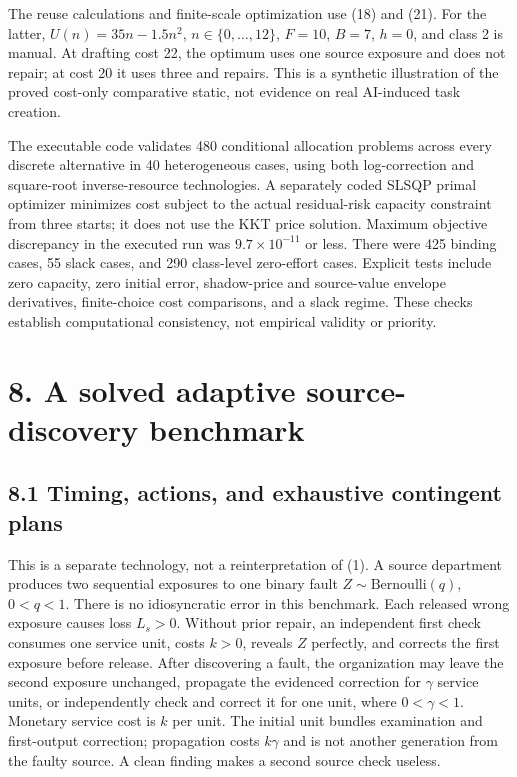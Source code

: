 \documentclass[
  11pt,
  a4paper,
]{article}
\begin{document}
The reuse calculations and finite-scale optimization use (18) and (21).
For the latter, \(U(n)=35n-1.5n^2\), \(n\in\{0,\ldots,12\}\), \(F=10\),
\(B=7\), \(h=0\), and class 2 is manual. At drafting cost 22, the
optimum uses one source exposure and does not repair; at cost 20 it uses
three and repairs. This is a synthetic illustration of the proved
cost-only comparative static, not evidence on real AI-induced task
creation.

The executable code validates 480 conditional allocation problems across
every discrete alternative in 40 heterogeneous cases, using both
log-correction and square-root inverse-resource technologies. A
separately coded SLSQP primal optimizer minimizes cost subject to the
actual residual-risk capacity constraint from three starts; it does not
use the KKT price solution. Maximum objective discrepancy in the
executed run was \(9.7\times10^{-11}\) or less. There were 425 binding
cases, 55 slack cases, and 290 class-level zero-effort cases. Explicit
tests include zero capacity, zero initial error, shadow-price and
source-value envelope derivatives, finite-choice cost comparisons, and a
slack regime. These checks establish computational consistency, not
empirical validity or priority.

\hypertarget{a-solved-adaptive-source-discovery-benchmark}{%
\section{8. A solved adaptive source-discovery
benchmark}\label{a-solved-adaptive-source-discovery-benchmark}}

\hypertarget{timing-actions-and-exhaustive-contingent-plans}{%
\subsection{8.1 Timing, actions, and exhaustive contingent
plans}\label{timing-actions-and-exhaustive-contingent-plans}}

This is a separate technology, not a reinterpretation of (1). A source
department produces two sequential exposures to one binary fault
\(Z\sim\mathrm{Bernoulli}(q)\), \(0<q<1\). There is no idiosyncratic
error in this benchmark. Each released wrong exposure causes loss
\(L_s>0\). Without prior repair, an independent first check consumes one
service unit, costs \(k>0\), reveals \(Z\) perfectly, and corrects the
first exposure before release. After discovering a fault, the
organization may leave the second exposure unchanged, propagate the
evidenced correction for \(\gamma\) service units, or independently
check and correct it for one unit, where \(0<\gamma<1\). Monetary
service cost is \(k\) per unit. The initial unit bundles examination and
first-output correction; propagation costs \(k\gamma\) and is not
another generation from the faulty source. A clean finding makes a
second source check useless.
\end{document}
